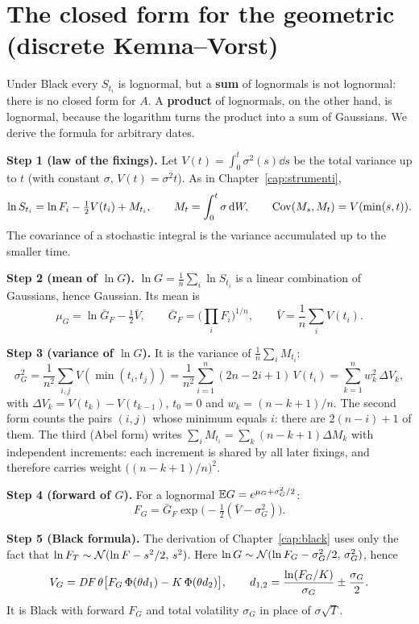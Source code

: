 \section{The closed form for the geometric (discrete Kemna--Vorst)}
Under Black every $S_{t_i}$ is lognormal, but a \textbf{sum} of lognormals is not lognormal: there is no closed form
for $A$. A \textbf{product} of lognormals, on the other hand, is lognormal, because the logarithm turns the product
into a sum of Gaussians. We derive the formula for arbitrary dates.

\noindent\textbf{Step 1 (law of the fixings).} Let $V(t)=\int_0^t\sigma^2(s)\dd s$ be the total variance up to $t$
(with constant $\sigma$, $V(t)=\sigma^2t$). As in Chapter~\ref{cap:strumenti},
\[
\ln S_{t_i}=\ln F_i-\tfrac12V(t_i)+M_{t_i},\qquad M_t=\int_0^t\sigma\mathop{}\!\mathrm{d} W,\qquad\operatorname{Cov}(M_s,M_t)=V(\min(s,t)).
\]
The covariance of a stochastic integral is the variance accumulated up to the smaller time.

\noindent\textbf{Step 2 (mean of $\ln G$).} $\ln G=\frac1n\sum_i\ln S_{t_i}$ is a linear combination of Gaussians,
hence Gaussian. Its mean is
\begin{equation}\label{eq:mu-G}
\mu_G=\ln\bar G_F-\tfrac12\bar V,\qquad\bar G_F=\Big(\prod_iF_i\Big)^{1/n},\qquad\bar V=\frac1n\sum_iV(t_i).
\end{equation}

\noindent\textbf{Step 3 (variance of $\ln G$).} It is the variance of $\frac1n\sum_iM_{t_i}$:
\begin{equation}\label{eq:sigma-G}
\sigma_G^2=\frac1{n^2}\sum_{i,j}V(\min(t_i,t_j))=\frac1{n^2}\sum_{i=1}^n(2n-2i+1)\,V(t_i)=\sum_{k=1}^nw_k^2\,\Delta V_k ,
\end{equation}
with $\Delta V_k=V(t_k)-V(t_{k-1})$, $t_0=0$ and $w_k=(n-k+1)/n$. The second form counts the pairs $(i,j)$ whose
minimum equals $i$: there are $2(n-i)+1$ of them. The third (Abel form) writes $\sum_iM_{t_i}=\sum_k(n-k+1)\Delta M_k$
with independent increments: each increment is shared by all later fixings, and therefore carries weight
$\big((n-k+1)/n\big)^2$.

\noindent\textbf{Step 4 (forward of $G$).} For a lognormal $\mathbb{E} G=e^{\mu_G+\sigma_G^2/2}$:
\begin{equation}\label{eq:FG}
F_G=\bar G_F\exp\!\big(-\tfrac12(\bar V-\sigma_G^2)\big).
\end{equation}

\noindent\textbf{Step 5 (Black formula).} The derivation of Chapter~\ref{cap:black} uses only the fact that
$\ln F_T\sim\mathcal{N}(\ln F-s^2/2,\,s^2)$. Here $\ln G\sim\mathcal{N}(\ln F_G-\sigma_G^2/2,\,\sigma_G^2)$, hence
\begin{equation}\label{eq:kv}
V_G=\mathit{DF}\,\theta\big[F_G\,\Phi(\theta d_1)-K\,\Phi(\theta d_2)\big],\qquad
d_{1,2}=\frac{\ln(F_G/K)}{\sigma_G}\pm\frac{\sigma_G}2 .
\end{equation}
It is Black with forward $F_G$ and total volatility $\sigma_G$ in place of $\sigma\sqrt T$.

